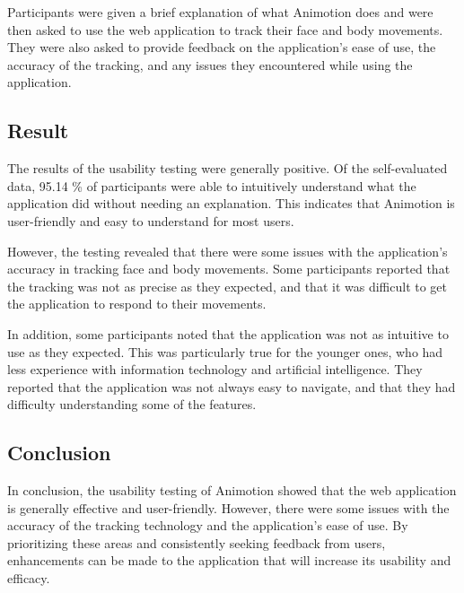Participants were given a brief explanation of what Animotion does and were then asked to use the web application to track 
their face and body movements. They were also asked to provide feedback on the application's ease of use, the accuracy of the tracking, and any issues 
they encountered while using the application.

\subsection{Result}
The results of the usability testing were generally positive. Of the self-evaluated data, 95.14 \% of participants were able to intuitively 
understand what the application did without needing an explanation. This indicates that Animotion is user-friendly and easy to understand for most users.

However, the testing revealed that there were some issues with the application's accuracy in tracking face and body 
movements. Some participants reported that the tracking was not as precise as they expected, and that it was difficult to get the 
application to respond to their movements.

In addition, some participants noted that the application was not as intuitive to use as they expected. This was particularly true for the younger 
ones, who had less experience with information technology and artificial intelligence. They reported that the application was not always easy to navigate, 
and that they had difficulty understanding some of the features.

\subsection{Conclusion}
In conclusion, the usability testing of Animotion showed that the web application is generally effective and user-friendly. 
However, there were some issues with the accuracy of the tracking technology and the application's ease of use. 
By prioritizing these areas and consistently seeking feedback from users, enhancements can be made to the application 
that will increase its usability and efficacy.